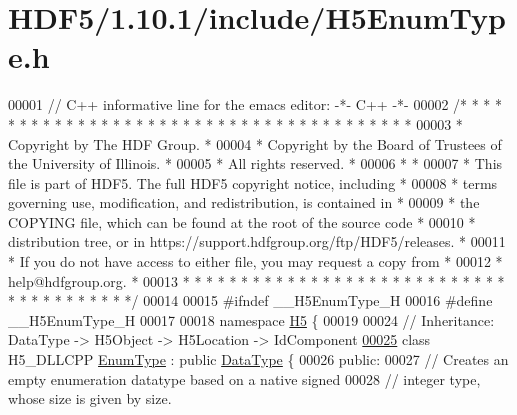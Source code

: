 \hypertarget{_h_d_f5_21_810_81_2include_2_h5_enum_type_8h_source}{}\section{H\+D\+F5/1.10.1/include/\+H5\+Enum\+Type.h}
\label{_h_d_f5_21_810_81_2include_2_h5_enum_type_8h_source}

\begin{DoxyCode}
00001 \textcolor{comment}{// C++ informative line for the emacs editor: -*- C++ -*-}
00002 \textcolor{comment}{/* * * * * * * * * * * * * * * * * * * * * * * * * * * * * * * * * * * * * * *}
00003 \textcolor{comment}{ * Copyright by The HDF Group.                                               *}
00004 \textcolor{comment}{ * Copyright by the Board of Trustees of the University of Illinois.         *}
00005 \textcolor{comment}{ * All rights reserved.                                                      *}
00006 \textcolor{comment}{ *                                                                           *}
00007 \textcolor{comment}{ * This file is part of HDF5.  The full HDF5 copyright notice, including     *}
00008 \textcolor{comment}{ * terms governing use, modification, and redistribution, is contained in    *}
00009 \textcolor{comment}{ * the COPYING file, which can be found at the root of the source code       *}
00010 \textcolor{comment}{ * distribution tree, or in https://support.hdfgroup.org/ftp/HDF5/releases.  *}
00011 \textcolor{comment}{ * If you do not have access to either file, you may request a copy from     *}
00012 \textcolor{comment}{ * help@hdfgroup.org.                                                        *}
00013 \textcolor{comment}{ * * * * * * * * * * * * * * * * * * * * * * * * * * * * * * * * * * * * * * */}
00014 
00015 \textcolor{preprocessor}{#ifndef \_\_H5EnumType\_H}
00016 \textcolor{preprocessor}{#define \_\_H5EnumType\_H}
00017 
00018 \textcolor{keyword}{namespace }\hyperlink{namespace_h5}{H5} \{
00019 
00024 \textcolor{comment}{//  Inheritance: DataType -> H5Object -> H5Location -> IdComponent}
\hyperlink{class_h5_1_1_enum_type}{00025} \textcolor{keyword}{class }H5\_DLLCPP \hyperlink{class_h5_1_1_enum_type}{EnumType} : \textcolor{keyword}{public} \hyperlink{class_h5_1_1_data_type}{DataType} \{
00026    \textcolor{keyword}{public}:
00027         \textcolor{comment}{// Creates an empty enumeration datatype based on a native signed}
00028         \textcolor{comment}{// integer type, whose size is given by size.}

\end{DoxyCode}
